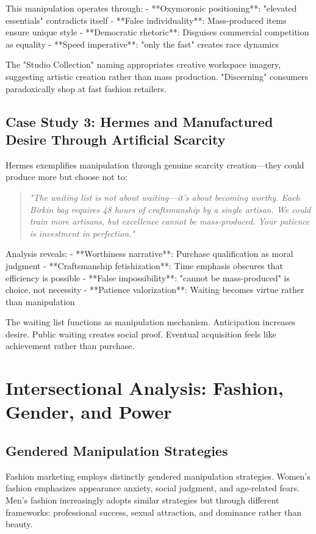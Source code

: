 This manipulation operates through:
- **Oxymoronic positioning**: "elevated essentials" contradicts itself
- **False individuality**: Mass-produced items ensure unique style
- **Democratic rhetoric**: Disguises commercial competition as equality
- **Speed imperative**: "only the fast" creates race dynamics

The "Studio Collection" naming appropriates creative workspace imagery, suggesting artistic creation rather than mass production. "Discerning" consumers paradoxically shop at fast fashion retailers.

\subsection{Case Study 3: Hermes and Manufactured Desire Through Artificial Scarcity}

Hermes exemplifies manipulation through genuine scarcity creation—they could produce more but choose not to:

\begin{quote}
\textit{"The waiting list is not about waiting—it's about becoming worthy. Each Birkin bag requires 48 hours of craftsmanship by a single artisan. We could train more artisans, but excellence cannot be mass-produced. Your patience is investment in perfection."}
\end{quote}

Analysis reveals:
- **Worthiness narrative**: Purchase qualification as moral judgment
- **Craftsmanship fetishization**: Time emphasis obscures that efficiency is possible
- **False impossibility**: "cannot be mass-produced" is choice, not necessity
- **Patience valorization**: Waiting becomes virtue rather than manipulation

The waiting list functions as manipulation mechanism. Anticipation increases desire. Public waiting creates social proof. Eventual acquisition feels like achievement rather than purchase.

\section{Intersectional Analysis: Fashion, Gender, and Power}
\label{sec:fashion_intersect}

\subsection{Gendered Manipulation Strategies}

Fashion marketing employs distinctly gendered manipulation strategies. Women's fashion emphasizes appearance anxiety, social judgment, and age-related fears. Men's fashion increasingly adopts similar strategies but through different frameworks: professional success, sexual attraction, and dominance rather than beauty.

